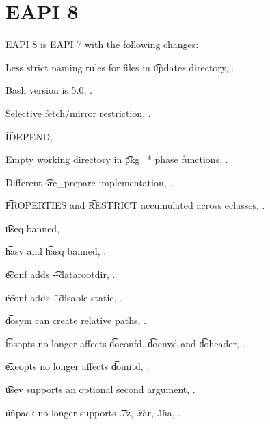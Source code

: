 \section*{EAPI 8}

EAPI 8 is EAPI 7 with the following changes:

\begin{compactitem}
\item Less strict naming rules for files in \t{updates} directory, .
\item Bash version is 5.0, .
\item Selective fetch/mirror restriction, .
\item \t{IDEPEND}, .
\item Empty working directory in \t{pkg_*} phase functions, .
\item Different \t{src_prepare} implementation, .
\item \t{PROPERTIES} and \t{RESTRICT} accumulated across eclasses, .
\item \t{useq} banned, .
\item \t{hasv} and \t{hasq} banned, .
\item \t{econf} adds \t{-{}-datarootdir}, .
\item \t{econf} adds \t{-{}-disable-static}, .
\item \t{dosym} can create relative paths, .
\item \t{insopts} no longer affects \t{doconfd}, \t{doenvd} and \t{doheader}, .
\item \t{exeopts} no longer affects \t{doinitd}, .
\item \t{usev} supports an optional second argument, .
\item \t{unpack} no longer supports \t{.7z}, \t{.rar}, \t{.lha}, .
\end{compactitem}



